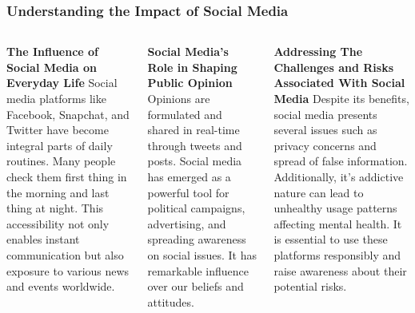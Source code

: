 \documentclass[5pt]{beamer}
\begin{document}
\begin{frame}
\frametitle{Understanding the Impact of Social Media}
\begin{columns}
\begin{column}{0.3\textwidth}
\begin{block}{\textbf{The Influence of Social Media on Everyday Life}}
Social media platforms like Facebook, Snapchat, and Twitter have become integral parts of daily routines. Many people check them first thing in the morning and last thing at night. This accessibility not only enables instant communication but also exposure to various news and events worldwide.
\end{block}
\end{column}
\begin{column}{0.3\textwidth}
\begin{block}{\textbf{Social Media's Role in Shaping Public Opinion}}
Opinions are formulated and shared in real-time through tweets and posts. Social media has emerged as a powerful tool for political campaigns, advertising, and spreading awareness on social issues. It has remarkable influence over our beliefs and attitudes.
\end{block}
\end{column}
\begin{column}{0.3\textwidth}
\begin{block}{\textbf{Addressing The Challenges and Risks Associated With Social Media}}
Despite its benefits, social media presents several issues such as privacy concerns and spread of false information. Additionally, it's addictive nature can lead to unhealthy usage patterns affecting mental health. It is essential to use these platforms responsibly and raise awareness about their potential risks.
\end{block}
\end{column}
\end{columns}
\end{frame}
\end{document}
